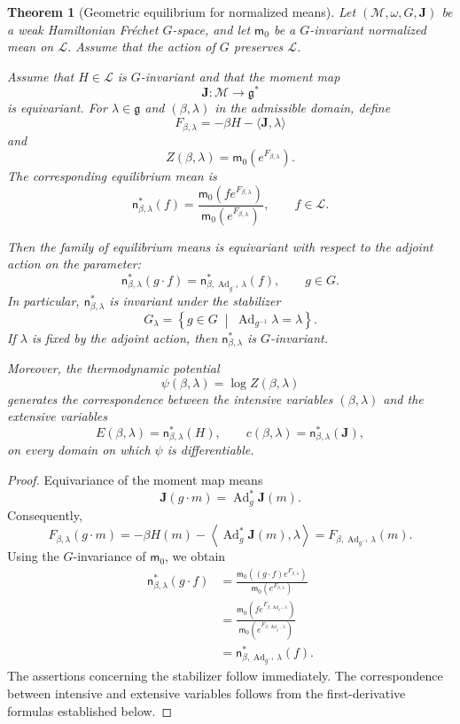 \documentclass[11pt,reqno]{amsart}
\newtheorem{Theorem}{Theorem}[section]
\begin{document}
\begin{Theorem}[Geometric equilibrium for normalized means]
\label{thm:geom-eq}
Let $(\mathcal M,\omega,G,\mathbf J)$ be a weak Hamiltonian Fréchet
$G$-space, and let $\mathsf m_0$ be a $G$-invariant normalized mean on
$\mathcal L$. Assume that the action of $G$ preserves $\mathcal L$.

Assume that $H\in\mathcal L$ is $G$-invariant and that the moment map
\[
\mathbf J\colon\mathcal M\longrightarrow\mathfrak g^*
\]
is equivariant. For $\lambda\in\mathfrak g$ and
$(\beta,\lambda)$ in the admissible domain, define
\[
F_{\beta,\lambda}
=
-\beta H-\langle\mathbf J,\lambda\rangle
\]
and
\[
Z(\beta,\lambda)
=
\mathsf m_0\left(e^{F_{\beta,\lambda}}\right).
\]
The corresponding equilibrium mean is
\[
\mathsf n_{\beta,\lambda}^{*}(f)
=
\frac{
\mathsf m_0\left(fe^{F_{\beta,\lambda}}\right)
}{
\mathsf m_0\left(e^{F_{\beta,\lambda}}\right)
},
\qquad
f\in\mathcal L.
\]

Then the family of equilibrium means is equivariant with respect to the
adjoint action on the parameter:
\[
\mathsf n_{\beta,\lambda}^{*}(g\cdot f)
=
\mathsf n_{\beta,\operatorname{Ad}_{g^{-1}}\lambda}^{*}(f),
\qquad
g\in G.
\]
In particular, $\mathsf n_{\beta,\lambda}^{*}$ is invariant under the
stabilizer
\[
G_\lambda
=
\left\{
g\in G
\;\middle|\;
\operatorname{Ad}_{g^{-1}}\lambda=\lambda
\right\}.
\]
If $\lambda$ is fixed by the adjoint action, then
$\mathsf n_{\beta,\lambda}^{*}$ is $G$-invariant.

Moreover, the thermodynamic potential
\[
\psi(\beta,\lambda)=\log Z(\beta,\lambda)
\]
generates the correspondence between the intensive variables
$(\beta,\lambda)$ and the extensive variables
\[
E(\beta,\lambda)
=
\mathsf n_{\beta,\lambda}^{*}(H),
\qquad
c(\beta,\lambda)
=
\mathsf n_{\beta,\lambda}^{*}(\mathbf J),
\]
on every domain on which $\psi$ is differentiable.
\end{Theorem}

\begin{proof}
Equivariance of the moment map means
\[
\mathbf J(g\cdot m)=\operatorname{Ad}_g^*\mathbf J(m).
\]
Consequently,
\[
F_{\beta,\lambda}(g\cdot m)
=
-\beta H(m)
-
\left\langle
\operatorname{Ad}_g^*\mathbf J(m),\lambda
\right\rangle
=
F_{\beta,\operatorname{Ad}_{g^{-1}}\lambda}(m).
\]
Using the $G$-invariance of $\mathsf m_0$, we obtain
\[
\begin{split}
\mathsf n_{\beta,\lambda}^{*}(g\cdot f)
&=
\frac{
\mathsf m_0\left((g\cdot f)e^{F_{\beta,\lambda}}\right)
}{
\mathsf m_0\left(e^{F_{\beta,\lambda}}\right)
}
\\
&=
\frac{
\mathsf m_0\left(
f e^{F_{\beta,\operatorname{Ad}_{g^{-1}}\lambda}}
\right)
}{
\mathsf m_0\left(
e^{F_{\beta,\operatorname{Ad}_{g^{-1}}\lambda}}
\right)
}
\\
&=
\mathsf n_{\beta,\operatorname{Ad}_{g^{-1}}\lambda}^{*}(f).
\end{split}
\]
The assertions concerning the stabilizer follow immediately. The
correspondence between intensive and extensive variables follows from
the first-derivative formulas established below.
\end{proof}
\end{document}
